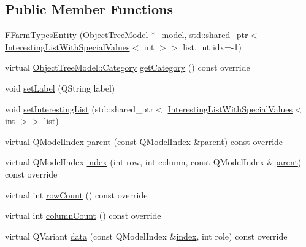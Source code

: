 \subsection*{Public Member Functions}
\begin{DoxyCompactItemize}
\item 
\mbox{\hyperlink{classobjecttree_1_1_f_farm_types_entity_ab24ece064bb4df8d5f414079a1b947dc}{F\+Farm\+Types\+Entity}} (\mbox{\hyperlink{class_object_tree_model}{Object\+Tree\+Model}} $\ast$\+\_\+model, std\+::shared\+\_\+ptr$<$ \mbox{\hyperlink{class_interesting_list_with_special_values}{Interesting\+List\+With\+Special\+Values}}$<$ int $>$$>$ list, int idx=-\/1)
\item 
virtual \mbox{\hyperlink{class_object_tree_model_a379e9d6b0d381853785adf62095ba4e3}{Object\+Tree\+Model\+::\+Category}} \mbox{\hyperlink{classobjecttree_1_1_f_farm_types_entity_a6b0ab1edb044f4feac77187629bbad6a}{get\+Category}} () const override
\item 
void \mbox{\hyperlink{classobjecttree_1_1_f_farm_types_entity_a0654c21dbf8c366fecc24e11c308a8a5}{set\+Label}} (Q\+String label)
\item 
void \mbox{\hyperlink{classobjecttree_1_1_f_farm_types_entity_a5c1b06052657342726e3767f3b51aab8}{set\+Interesting\+List}} (std\+::shared\+\_\+ptr$<$ \mbox{\hyperlink{class_interesting_list_with_special_values}{Interesting\+List\+With\+Special\+Values}}$<$ int $>$$>$ list)
\item 
virtual Q\+Model\+Index \mbox{\hyperlink{classobjecttree_1_1_f_farm_types_entity_a9cb1457a01d350dbfa38e0c036083afe}{parent}} (const Q\+Model\+Index \&parent) const override
\item 
virtual Q\+Model\+Index \mbox{\hyperlink{classobjecttree_1_1_f_farm_types_entity_af2a94ebd0631e46e494a87e60153bde9}{index}} (int row, int column, const Q\+Model\+Index \&\mbox{\hyperlink{classobjecttree_1_1_f_farm_types_entity_a9cb1457a01d350dbfa38e0c036083afe}{parent}}) const override
\item 
virtual int \mbox{\hyperlink{classobjecttree_1_1_f_farm_types_entity_a58ee100018ced9ecf7aaef8bf9b56ff1}{row\+Count}} () const override
\item 
virtual int \mbox{\hyperlink{classobjecttree_1_1_f_farm_types_entity_a755bc0ac305b52156994c0ce92e7d5fe}{column\+Count}} () const override
\item 
virtual Q\+Variant \mbox{\hyperlink{classobjecttree_1_1_f_farm_types_entity_a3c5fcc80d3a08041d5f9e758f7595d5f}{data}} (const Q\+Model\+Index \&\mbox{\hyperlink{classobjecttree_1_1_f_farm_types_entity_af2a94ebd0631e46e494a87e60153bde9}{index}}, int role) const override

\end{DoxyCompactItemize}

